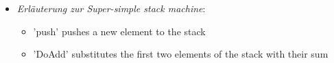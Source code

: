 \begin{itemize}
  \item \textit{Erläuterung zur Super-simple stack machine}:\\
    \begin{itemize}
      \item 'push' pushes a new element to the stack
      \item 'DoAdd' substitutes the first two elements of the stack with their sum
    \end{itemize}

        
\end{itemize}









